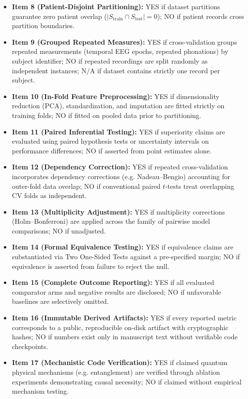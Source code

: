 \documentclass[10pt,a4paper]{article}
\begin{document}
\begin{itemize}
  \item \textbf{Item 8 (Patient-Disjoint Partitioning):} YES if dataset partitions guarantee zero patient overlap ($|S_{\text{train}} \cap S_{\text{test}}| = 0$); NO if patient records cross partition boundaries.
  \item \textbf{Item 9 (Grouped Repeated Measures):} YES if cross-validation groups repeated measurements (temporal EEG epochs, repeated phonations) by subject identifier; NO if repeated recordings are split randomly as independent instances; N/A if dataset contains strictly one record per subject.
  \item \textbf{Item 10 (In-Fold Feature Preprocessing):} YES if dimensionality reduction (PCA), standardization, and imputation are fitted strictly on training folds; NO if fitted on pooled data prior to partitioning.
  \item \textbf{Item 11 (Paired Inferential Testing):} YES if superiority claims are evaluated using paired hypothesis tests or uncertainty intervals on performance differences; NO if asserted from point estimates alone.
  \item \textbf{Item 12 (Dependency Correction):} YES if repeated cross-validation incorporates dependency corrections (e.g. Nadeau--Bengio) accounting for outer-fold data overlap; NO if conventional paired $t$-tests treat overlapping CV folds as independent.
  \item \textbf{Item 13 (Multiplicity Adjustment):} YES if multiplicity corrections (Holm--Bonferroni) are applied across the family of pairwise model comparisons; NO if unadjusted.
  \item \textbf{Item 14 (Formal Equivalence Testing):} YES if equivalence claims are substantiated via Two One-Sided Tests against a pre-specified margin; NO if equivalence is asserted from failure to reject the null.
  \item \textbf{Item 15 (Complete Outcome Reporting):} YES if all evaluated comparator arms and negative results are disclosed; NO if unfavorable baselines are selectively omitted.
  \item \textbf{Item 16 (Immutable Derived Artifacts):} YES if every reported metric corresponds to a public, reproducible on-disk artifact with cryptographic hashes; NO if numbers exist only in manuscript text without verifiable code checkpoints.
  \item \textbf{Item 17 (Mechanistic Code Verification):} YES if claimed quantum physical mechanisms (e.g. entanglement) are verified through ablation experiments demonstrating causal necessity; NO if claimed without empirical mechanism testing.
\end{itemize}
\end{document}
